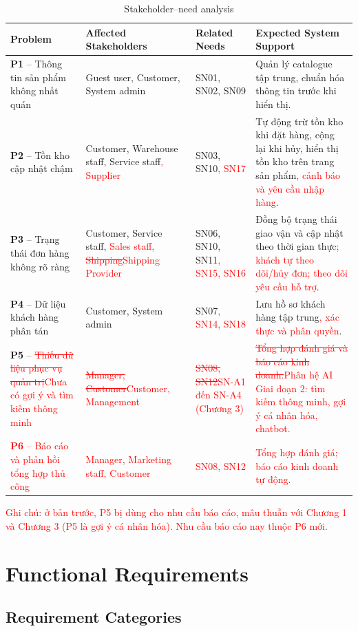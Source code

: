 \documentclass[12pt,a4paper,oneside]{report}
\newif\ifmark \marktrue
\newcommand{\chg}[1]{\ifmark\textcolor{red}{#1}\else #1\fi}
\newcommand{\del}[1]{\ifmark\textcolor{red}{\sout{#1}}\fi}
\begin{document}
\begin{longtable}{p{3.2cm}p{3.8cm}p{3.2cm}p{5.8cm}}
\caption{Stakeholder--need analysis}\\
\toprule
\textbf{Problem} & \textbf{Affected Stakeholders} & \textbf{Related Needs} & \textbf{Expected System Support} \\
\midrule
\endhead
\bottomrule
\endlastfoot
\textbf{P1} -- Thông tin sản phẩm không nhất quán & Guest user, Customer, System admin & SN01, SN02, SN09 & Quản lý catalogue tập trung, chuẩn hóa thông tin trước khi hiển thị. \\
\textbf{P2} -- Tồn kho cập nhật chậm & Customer, Warehouse staff, Service staff\chg{, Supplier} & SN03, SN10\chg{, SN17} & Tự động trừ tồn kho khi đặt hàng, cộng lại khi hủy, hiển thị tồn kho trên trang sản phẩm\chg{, cảnh báo và yêu cầu nhập hàng}. \\
\textbf{P3} -- Trạng thái đơn hàng không rõ ràng & Customer, Service staff, \chg{Sales staff, }\del{Shipping}\chg{Shipping Provider} & SN06, SN10, SN11\chg{, SN15, SN16} & Đồng bộ trạng thái giao vận và cập nhật theo thời gian thực\chg{; khách tự theo dõi/hủy đơn; theo dõi yêu cầu hỗ trợ}. \\
\textbf{P4} -- Dữ liệu khách hàng phân tán & Customer, System admin & SN07\chg{, SN14, SN18} & Lưu hồ sơ khách hàng tập trung\chg{, xác thực và phân quyền}. \\
\textbf{P5} -- \del{Thiếu dữ liệu phục vụ quản trị}\chg{Chưa có gợi ý và tìm kiếm thông minh} & \del{Manager, Customer}\chg{Customer, Management} & \del{SN08, SN12}\chg{SN-A1 đến SN-A4 (Chương 3)} & \del{Tổng hợp đánh giá và báo cáo kinh doanh.}\chg{Phân hệ AI Giai đoạn 2: tìm kiếm thông minh, gợi ý cá nhân hóa, chatbot.} \\
\chg{\textbf{P6} -- Báo cáo và phản hồi tổng hợp thủ công} & \chg{Manager, Marketing staff, Customer} & \chg{SN08, SN12} & \chg{Tổng hợp đánh giá; báo cáo kinh doanh tự động.} \\
\end{longtable}

\chg{Ghi chú: ở bản trước, P5 bị dùng cho nhu cầu báo cáo, mâu thuẫn với Chương 1 và Chương 3 (P5 là gợi ý cá nhân hóa). Nhu cầu báo cáo nay thuộc P6 mới.}

\section{Functional Requirements}

\subsection{Requirement Categories}
\end{document}
